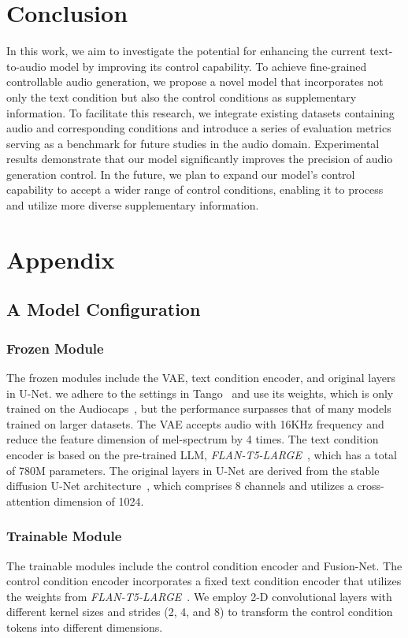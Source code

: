 \documentclass[letterpaper]{article}
\begin{document}
\section{Conclusion}

In this work, we aim to investigate the potential for enhancing the current text-to-audio model by improving its control capability. To achieve fine-grained controllable audio generation, we propose a novel model that incorporates not only the text condition but also the control conditions as supplementary information. To facilitate this research, we integrate existing datasets containing audio and corresponding conditions and introduce a series of evaluation metrics serving as a benchmark for future studies in the audio domain. Experimental results demonstrate that our model significantly improves the precision of audio generation control. In the future, we plan to expand our model's control capability to accept a wider range of control conditions, enabling it to process and utilize more diverse supplementary information.


\section{Appendix}

\subsection{A Model Configuration}

\subsubsection{Frozen Module} The frozen modules include the VAE, text condition encoder, and original layers in U-Net. we adhere to the settings in Tango~\cite{ghosal2023tango} and use its weights, which is only trained on the Audiocaps~\cite{kim2019audiocaps}, but the performance surpasses that of many models trained on larger datasets. The VAE accepts audio with 16KHz
frequency and reduce the feature dimension of mel-spectrum by 4 times. The text condition encoder is based on the pre-trained LLM, \textit{FLAN-T5-LARGE}~\cite{chung2022siflm}, which has a total of 780M parameters. The original layers in U-Net are derived from the stable diffusion U-Net architecture~\cite{ronneberger2015unet,rombach2021highresolution}, which comprises 8 channels and utilizes a cross-attention dimension of 1024.

\subsubsection{Trainable Module} The trainable modules include the control condition encoder and Fusion-Net. The control condition encoder incorporates a fixed text condition encoder that utilizes the weights from \textit{FLAN-T5-LARGE}~\cite{chung2022siflm}.  We employ 2-D convolutional layers with different kernel sizes and strides (2, 4, and 8) to transform the control condition tokens into different dimensions.
\end{document}
